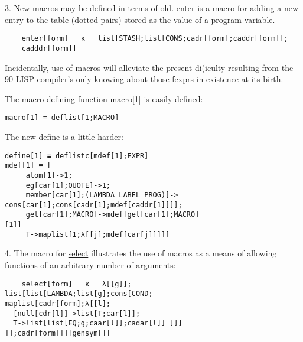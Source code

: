 \documentclass{article}
\begin{document}
3. New macros may be defined in terms of old. \underline{enter} is a macro for adding a new entry to the table (dotted pairs) stored as the value of a program variable.
\begin{verbatim}
    enter[form]   κ   list[STASH;list[CONS;cadr[form];caddr[form]];
    cadddr[form]]
\end{verbatim}

Incidentally, use of macros will alleviate the present di(iculty resulting from the 90 LISP compiler's only knowing about those fexprs in existence at its birth.

The macro defining function \underline{macro[1]} is easily defined:
\begin{verbatim}
macro[1] ≡ deflist[1;MACRO]
\end{verbatim}

The new \underline{define} is a little harder:
\begin{verbatim}
define[1] ≡ deflistc[mdef[1];EXPR]
mdef[1] ≡ [
     atom[1]->1;
     eg[car[1];QUOTE]->1;
     member[car[1];(LAMBDA LABEL PROG)]->
cons[car[1];cons[cadr[1];mdef[caddr[1]]]];
     get[car[1];MACRO]->mdef[get[car[1];MACRO]
[1]]
     T->maplist[1;λ[[j];mdef[car[j]]]]]
\end{verbatim}

4. The macro for \underline{select} illustrates the use of macros as a means of allowing functions of an arbitrary number of arguments:

\begin{verbatim}
    select[form]   κ   λ[[g]];
list[list[LAMBDA;list[g];cons[COND;
maplist[cadr[form];λ[[l];
  [null[cdr[l]]->list[T;car[l]];
  T->list[list[EQ;g;caar[l]];cadar[l]] ]]]
]];cadr[form]]][gensym[]]
\end{verbatim}
\end{document}
